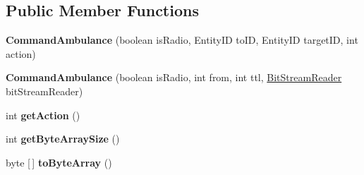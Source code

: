 \subsection*{Public Member Functions}
\begin{DoxyCompactItemize}
\item 
\hypertarget{classadf_1_1agent_1_1communication_1_1standard_1_1bundle_1_1centralized_1_1CommandAmbulance_af4c58ca174dd264b77e8437cd349f7d5}{}\label{classadf_1_1agent_1_1communication_1_1standard_1_1bundle_1_1centralized_1_1CommandAmbulance_af4c58ca174dd264b77e8437cd349f7d5} 
{\bfseries Command\+Ambulance} (boolean is\+Radio, Entity\+ID to\+ID, Entity\+ID target\+ID, int action)
\item 
\hypertarget{classadf_1_1agent_1_1communication_1_1standard_1_1bundle_1_1centralized_1_1CommandAmbulance_a48208b238525c43b3b343f574b14608d}{}\label{classadf_1_1agent_1_1communication_1_1standard_1_1bundle_1_1centralized_1_1CommandAmbulance_a48208b238525c43b3b343f574b14608d} 
{\bfseries Command\+Ambulance} (boolean is\+Radio, int from, int ttl, \hyperlink{classadf_1_1component_1_1communication_1_1util_1_1BitStreamReader}{Bit\+Stream\+Reader} bit\+Stream\+Reader)
\item 
\hypertarget{classadf_1_1agent_1_1communication_1_1standard_1_1bundle_1_1centralized_1_1CommandAmbulance_a0fdaa5d090d6c487e2c7664e190160e1}{}\label{classadf_1_1agent_1_1communication_1_1standard_1_1bundle_1_1centralized_1_1CommandAmbulance_a0fdaa5d090d6c487e2c7664e190160e1} 
int {\bfseries get\+Action} ()
\item 
\hypertarget{classadf_1_1agent_1_1communication_1_1standard_1_1bundle_1_1centralized_1_1CommandAmbulance_aaf0888999907ffc19c94654fb56cbefb}{}\label{classadf_1_1agent_1_1communication_1_1standard_1_1bundle_1_1centralized_1_1CommandAmbulance_aaf0888999907ffc19c94654fb56cbefb} 
int {\bfseries get\+Byte\+Array\+Size} ()
\item 
\hypertarget{classadf_1_1agent_1_1communication_1_1standard_1_1bundle_1_1centralized_1_1CommandAmbulance_ae22089145f07edd60988c11068d511eb}{}\label{classadf_1_1agent_1_1communication_1_1standard_1_1bundle_1_1centralized_1_1CommandAmbulance_ae22089145f07edd60988c11068d511eb} 
byte \mbox{[}$\,$\mbox{]} {\bfseries to\+Byte\+Array} ()
\item 
\hypertarget{classadf_1_1agent_1_1communication_1_1standard_1_1bundle_1_1centralized_1_1CommandAmbulance_a8bc9847a401dbf94039f2ca30cc36590}{}\label{classadf_1_1agent_1_1communication_1_1standard_1_1bundle_1_1centralized_1_1CommandAmbulance_a8bc9847a401dbf94039f2ca30cc36590} 

\end{DoxyCompactItemize}
